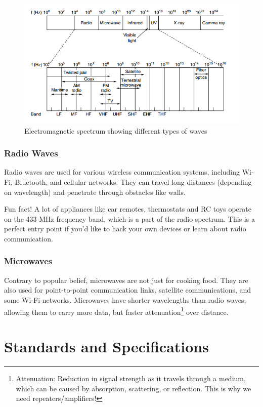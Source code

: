 \begin{figure}[h]
    \centering
    \includegraphics[width=.8\textwidth]{assets/osi/physical/spectrum.png}
    \caption{Electromagnetic spectrum showing different types of waves}\label{fig:em_spectrum}
\end{figure}

\subsubsection*{Radio Waves}
Radio waves are used for various wireless communication systems, including Wi-Fi, Bluetooth, and cellular networks. They can travel long distances (depending on wavelength) and penetrate through obstacles like walls.

\begin{noteblock}
    Fun fact! A lot of appliances like car remotes, thermostats and RC toys operate on the 433 MHz frequency band, which is a part of the radio spectrum. This is a perfect entry point if you'd like to hack your own devices or learn about radio communication.
\end{noteblock}

\subsubsection*{Microwaves}
Contrary to popular belief, microwaves are not just for cooking food. They are also used for point-to-point communication links, satellite communications, and some Wi-Fi networks. Microwaves have shorter wavelengths than radio waves, allowing them to carry more data, but faster attenuation\footnote{
    Attenuation: Reduction in signal strength as it travels through a medium, which can be caused by absorption, scattering, or reflection. 
    This is why we need repeaters/amplifiers!
} over distance.

\section{Standards and Specifications}

